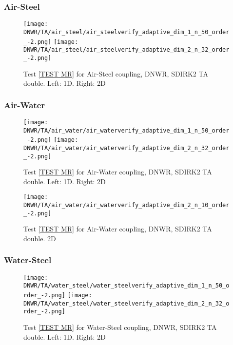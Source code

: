 \documentclass[a4paper,10pt]{article}
\begin{document}
\FloatBarrier
\subsubsection{Air-Steel}\label{SEC DNWR TA DOUBLE AIR STEEL}
% 

\begin{figure}[!ht]
\texttt{[image: DNWR/TA/air\_steel/air\_steelverify\_adaptive\_dim\_1\_n\_50\_order\_-2.png]}
\texttt{[image: DNWR/TA/air\_steel/air\_steelverify\_adaptive\_dim\_2\_n\_32\_order\_-2.png]}
\caption{Test \ref{TEST MR} for Air-Steel coupling, DNWR, SDIRK2 TA double. Left: 1D. Right: 2D}
\label{FIG DNWR SDIRK2 TA DOUBLE AIR STEEL}
\end{figure}

\FloatBarrier
\subsubsection{Air-Water}\label{SEC DNWR TA DOUBLE AIR WATER}
% 

\begin{figure}[!ht]
\texttt{[image: DNWR/TA/air\_water/air\_waterverify\_adaptive\_dim\_1\_n\_50\_order\_-2.png]}
\texttt{[image: DNWR/TA/air\_water/air\_waterverify\_adaptive\_dim\_2\_n\_32\_order\_-2.png]}
\caption{Test \ref{TEST MR} for Air-Water coupling, DNWR, SDIRK2 TA double. Left: 1D. Right: 2D}
\label{FIG DNWR SDIRK2 TA DOUBLE AIR WATER}
\end{figure}

\begin{figure}[!ht]
\texttt{[image: DNWR/TA/air\_water/air\_waterverify\_adaptive\_dim\_2\_n\_10\_order\_-2.png]}
\caption{Test \ref{TEST MR} for Air-Water coupling, DNWR, SDIRK2 TA double. 2D}
\label{FIG DNWR SDIRK2 TA DOUBLE AIR WATER 2}
\end{figure}

\FloatBarrier
\subsubsection{Water-Steel}\label{SEC DNWR TA DOUBLE WATER STEEL}
% 

\begin{figure}[!ht]
\texttt{[image: DNWR/TA/water\_steel/water\_steelverify\_adaptive\_dim\_1\_n\_50\_order\_-2.png]}
\texttt{[image: DNWR/TA/water\_steel/water\_steelverify\_adaptive\_dim\_2\_n\_32\_order\_-2.png]}
\caption{Test \ref{TEST MR} for Water-Steel coupling, DNWR, SDIRK2 TA double. Left: 1D. Right: 2D}
\label{FIG DNWR SDIRK2 TA DOUBLE WATER STEEL}
\end{figure}
\end{document}
